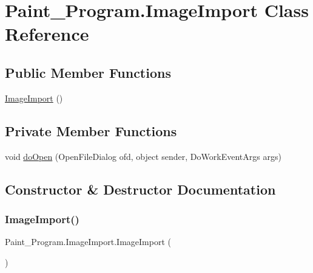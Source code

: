 \hypertarget{class_paint___program_1_1_image_import}{}\section{Paint\+\_\+\+Program.\+Image\+Import Class Reference}
\label{class_paint___program_1_1_image_import}
\subsection*{Public Member Functions}
\begin{DoxyCompactItemize}
\item 
\mbox{\hyperlink{class_paint___program_1_1_image_import_a5765b2ce24cc009c2a15398af17a977a}{Image\+Import}} ()
\end{DoxyCompactItemize}
\subsection*{Private Member Functions}
\begin{DoxyCompactItemize}
\item 
void \mbox{\hyperlink{class_paint___program_1_1_image_import_ae00dcd97307687b44917c11645487a1a}{do\+Open}} (Open\+File\+Dialog ofd, object sender, Do\+Work\+Event\+Args args)
\end{DoxyCompactItemize}


\subsection{Constructor \& Destructor Documentation}
\mbox{\label{class_paint___program_1_1_image_import_a5765b2ce24cc009c2a15398af17a977a}} 
\subsubsection{\texorpdfstring{Image\+Import()}{ImageImport()}}
{\footnotesize\ttfamily Paint\+\_\+\+Program.\+Image\+Import.\+Image\+Import (\begin{DoxyParamCaption}{ }\end{DoxyParamCaption})\hspace{0.3cm}{\ttfamily [inline]}}



